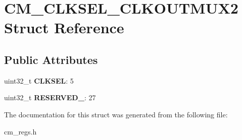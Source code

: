 \hypertarget{structCM__CLKSEL__CLKOUTMUX2}{\section{C\-M\-\_\-\-C\-L\-K\-S\-E\-L\-\_\-\-C\-L\-K\-O\-U\-T\-M\-U\-X2 Struct Reference}
\label{structCM__CLKSEL__CLKOUTMUX2}
}
\subsection*{Public Attributes}
\begin{DoxyCompactItemize}
\item 
\hypertarget{structCM__CLKSEL__CLKOUTMUX2_a43988b9d28b059e33ec9fd2ecddfe688}{uint32\-\_\-t {\bfseries C\-L\-K\-S\-E\-L}\-: 5}\label{structCM__CLKSEL__CLKOUTMUX2_a43988b9d28b059e33ec9fd2ecddfe688}

\item 
\hypertarget{structCM__CLKSEL__CLKOUTMUX2_a4002df2d90cb383ad3ce3527382589e3}{uint32\-\_\-t {\bfseries R\-E\-S\-E\-R\-V\-E\-D\-\_}\-: 27}\label{structCM__CLKSEL__CLKOUTMUX2_a4002df2d90cb383ad3ce3527382589e3}

\end{DoxyCompactItemize}


The documentation for this struct was generated from the following file\-:\begin{DoxyCompactItemize}
\item 
cm\-\_\-regs.\-h\end{DoxyCompactItemize}
